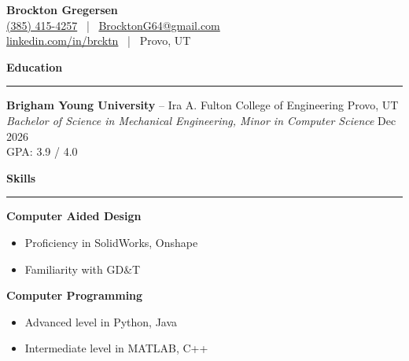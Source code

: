 \documentclass[a4paper,10pt]{article}
\newcommand{\sectionline}{\noindent\rule{\linewidth}{1pt}\vspace{-0.5em}}  %
\begin{document}
\begin{center}
    {\huge \textbf{Brockton Gregersen}} \\
    \href{tel:+13854154257}{(385) 415-4257} \ | \ \href{mailto:BrocktonG64@gmail.com}{BrocktonG64@gmail.com} \ \\
    \href{https://linkedin.com/in/brcktn}{linkedin.com/in/brcktn} \ | \ Provo, UT
\end{center}

\textbf{\large Education} \vspace{-1em}\\
\sectionline

\textbf{Brigham Young University} -- Ira A. Fulton College of Engineering \hfill Provo, UT \\
\emph{Bachelor of Science in Mechanical Engineering, Minor in Computer Science} \hfill Dec 2026 \\
GPA: 3.9 / 4.0\


\textbf{\large Skills} \vspace{-1em}\\
\sectionline
\vspace{-0.5em}
\begin{multicols}{2}
    \textbf{Computer Aided Design}
    \begin{itemize}[noitemsep, topsep=0pt]
        \item Proficiency in SolidWorks, Onshape
        \item Familiarity with GD\&T
    \end{itemize}

    \columnbreak

    \textbf{Computer Programming}
    \begin{itemize}[noitemsep, topsep=0pt]
        \item Advanced level in Python, Java
        \item Intermediate level in MATLAB, C++
    \end{itemize}
\end{multicols}
\vspace{-1em}
\end{document}
